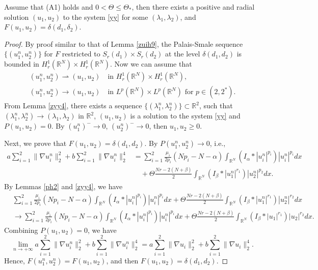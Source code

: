 \documentclass[reqno]{amsart}
\begin{document}
\begin{lemma}\label{lmk}
Assume that {\rm (A1)} holds and $0<\Theta\leq\Theta_*$, then there exists a 
positive and radial solution $(u_1,u_2)$ to the system \eqref{yy} for some
$(\lambda_1,\lambda_2)$, and $F(u_1,u_2)=\delta(d_1,\delta_2)$.
\end{lemma}

\begin{proof}
By proof similar to that  of Lemma \ref{zuih9}, the Palais-Smale sequence 
$\{(u_1^n,u_2^n)\}$ for $F$ restricted to
$S_r(d_1)\times S_r(d_2)$ at the level $\delta(d_1,d_2)$ is bounded in 
$H_r^1(\mathbb{R}^N)\times H_r^1(\mathbb{R}^N)$.
Now we can assume that
\begin{gather*}
(u_1^n,u_2^n)\rightharpoonup(u_1,u_2) \quad \text{in }
 H_r^1(\mathbb{R}^N)\times H_r^1(\mathbb{R}^N), \\
(u_1^n,u_2^n)\to (u_1,u_2) \quad \text{in } L^p(\mathbb{R}^N)\times 
L^p(\mathbb{R}^N) \text{ for } p\in(2,2^*).
\end{gather*}
From Lemma \ref{zyy4}, there exists a sequence 
$\{(\lambda_1^n,\lambda_2^n)\}\subset\mathbb{R}^2$, such that 
$(\lambda_1^n,\lambda_2^n)\to (\lambda_1,\lambda_2)$ in $\mathbb{R}^2$, 
$(u_1,u_2)$ is a solution to the system \eqref{yy} and $P(u_1,u_2)=0$. 
By $(u_1^n)^-\to 0$, $(u_2^n)^-\to 0$, then $u_1,u_2\geq0$.

Next, we prove that $F(u_1,u_2)=\delta(d_1,d_2)$. By $P(u_1^n,u_2^n)\to 0$, i.e.,
\begin{equation}\label{fmb}
\begin{aligned}
a\sum_{i=1}^2\| \nabla u_i^n\|_2^2+b\sum_{i=1}^2\| \nabla u_i^n\|_2^4 
&= \sum_{i=1}^2\frac{\mu_i}{2p_i}(Np_i-N-\alpha)\int_{\mathbb{R}^N}
 (I_\alpha\ast|u_i^n|^{p_i})|u_i^n|^{p_i}dx \\
&\quad +\Theta\frac{Nr-2(N+\beta)}{2}\int_{\mathbb{R}^N}
(I_\beta\ast|u_1^n|^{r_1})|u_2^n|^{p_2} dx.
\end{aligned}
\end{equation}
By Lemmas \ref{ph2} and \ref{zyy4}, we have
\begin{align*}
&\sum_{i=1}^2\frac{\mu_i}{2p_i}(Np_i-N-\alpha)\int_{\mathbb{R}^N}
 (I_\alpha\ast|u_i^n|^{p_i})|u_i^n|^{p_i}dx+\Theta\frac{Nr-2(N+\beta)}{2}
\int_{\mathbb{R}^N}(I_\beta\ast|u_1^n|^{r_1})|u_2^n|^{r_2}dx \\
&\to  \sum_{i=1}^2\frac{\mu_i}{2p_i}(Np_i-N-\alpha)\int_{\mathbb{R}^N}(I_\alpha
 \ast|u_i^n|^{p_i})|u_i^n|^{p_i}dx+\Theta\frac{Nr-2(N+\beta)}{2}
 \int_{\mathbb{R}^N}(I_\beta\ast|u_1|^{r_1})|u_2|^{r_2}dx.
\end{align*}
Combining $P(u_1,u_2)=0$, we have
\[
\lim_{n\to +\infty}a\sum_{i=1}^2\| \nabla u_i^n\|_2^2
 +b\sum_{i=1}^2\| \nabla u_i^n\|_2^4
= a\sum_{i=1}^2\| \nabla u_i\|_2^2+b\sum_{i=1}^2\| \nabla u_i\|_2^4.
\]
Hence, $F(u_1^n,u_2^n)=F(u_1,u_2)$, and then $F(u_1,u_2)=\delta(d_1,d_2)$.
\end{proof}
\end{document}
